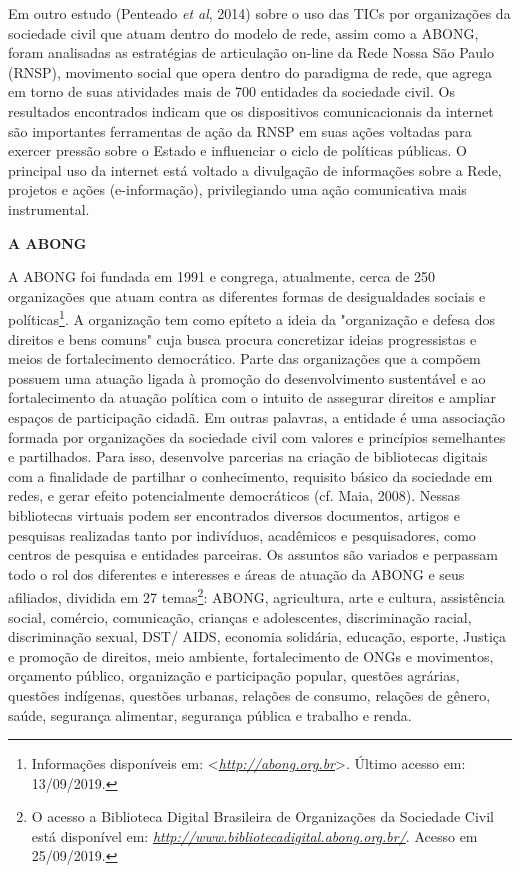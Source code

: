 Em outro estudo (Penteado \emph{et al}, 2014) sobre o uso das TICs por
organizações da sociedade civil que atuam dentro do modelo de rede,
assim como a ABONG, foram analisadas as estratégias de articulação
on-line da Rede Nossa São Paulo (RNSP), movimento social que opera
dentro do paradigma de rede, que agrega em torno de suas atividades mais
de 700 entidades da sociedade civil. Os resultados encontrados indicam
que os dispositivos comunicacionais da internet são importantes
ferramentas de ação da RNSP em suas ações voltadas para exercer pressão
sobre o Estado e influenciar o ciclo de políticas públicas. O principal
uso da internet está voltado a divulgação de informações sobre a Rede,
projetos e ações (e-informação), privilegiando uma ação comunicativa
mais instrumental.

\textbf{A ABONG}

A ABONG foi fundada em 1991 e congrega, atualmente, cerca de 250
organizações que atuam contra as diferentes formas de desigualdades
sociais e políticas\footnote{Informações disponíveis em:
  \textless{}\href{http://abong.org.br}{\emph{http://abong.org.br}}\textgreater{}.
  Último acesso em: 13/09/2019.}. A organização tem como epíteto a ideia
da "organização e defesa dos direitos e bens comuns" cuja busca procura
concretizar ideias progressistas e meios de fortalecimento democrático.
Parte das organizações que a compõem possuem uma atuação ligada à
promoção do desenvolvimento sustentável e ao fortalecimento da atuação
política com o intuito de assegurar direitos e ampliar espaços de
participação cidadã. Em outras palavras, a entidade é uma associação
formada por organizações da sociedade civil com valores e princípios
semelhantes e partilhados. Para isso, desenvolve parcerias na criação de
bibliotecas digitais com a finalidade de partilhar o conhecimento,
requisito básico da sociedade em redes, e gerar efeito potencialmente
democráticos (cf. Maia, 2008). Nessas bibliotecas virtuais podem ser
encontrados diversos documentos, artigos e pesquisas realizadas tanto
por indivíduos, acadêmicos e pesquisadores, como centros de pesquisa e
entidades parceiras. Os assuntos são variados e perpassam todo o rol dos
diferentes e interesses e áreas de atuação da ABONG e seus afiliados,
dividida em 27 temas\footnote{O acesso a Biblioteca Digital Brasileira
  de Organizações da Sociedade Civil está disponível em:
  \href{http://www.bibliotecadigital.abong.org.br/}{\emph{http://www.bibliotecadigital.abong.org.br/}}.
  Acesso em 25/09/2019.}: ABONG, agricultura, arte e cultura,
assistência social, comércio, comunicação, crianças e adolescentes,
discriminação racial, discriminação sexual, DST/ AIDS, economia
solidária, educação, esporte, Justiça e promoção de direitos, meio
ambiente, fortalecimento de ONGs e movimentos, orçamento público,
organização e participação popular, questões agrárias, questões
indígenas, questões urbanas, relações de consumo, relações de gênero,
saúde, segurança alimentar, segurança pública e trabalho e renda.

